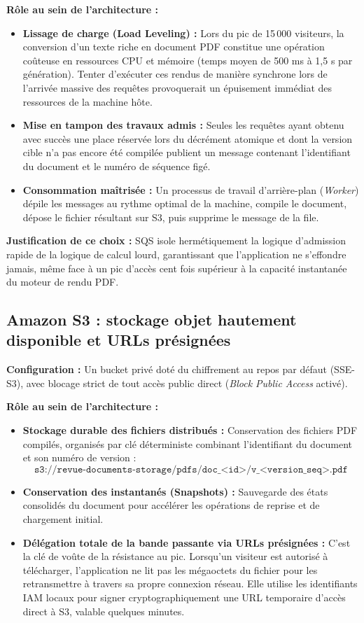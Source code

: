 \textbf{Rôle au sein de l'architecture :}
\begin{itemize}
    \item \textbf{Lissage de charge (Load Leveling) :} Lors du pic de 15\,000 visiteurs, la conversion d'un texte riche en document PDF constitue une opération coûteuse en ressources CPU et mémoire (temps moyen de 500 ms à 1,5 s par génération). Tenter d'exécuter ces rendus de manière synchrone lors de l'arrivée massive des requêtes provoquerait un épuisement immédiat des ressources de la machine hôte.
    \item \textbf{Mise en tampon des travaux admis :} Seules les requêtes ayant obtenu avec succès une place réservée lors du décrément atomique et dont la version cible n'a pas encore été compilée publient un message contenant l'identifiant du document et le numéro de séquence figé.
    \item \textbf{Consommation maîtrisée :} Un processus de travail d'arrière-plan (\emph{Worker}) dépile les messages au rythme optimal de la machine, compile le document, dépose le fichier résultant sur S3, puis supprime le message de la file.
\end{itemize}

\textbf{Justification de ce choix :}
SQS isole hermétiquement la logique d'admission rapide de la logique de calcul lourd, garantissant que l'application ne s'effondre jamais, même face à un pic d'accès cent fois supérieur à la capacité instantanée du moteur de rendu PDF.

\subsection{Amazon S3 : stockage objet hautement disponible et URLs présignées}

\textbf{Configuration :} Un bucket privé doté du chiffrement au repos par défaut (SSE-S3), avec blocage strict de tout accès public direct (\emph{Block Public Access} activé).

\textbf{Rôle au sein de l'architecture :}
\begin{itemize}
    \item \textbf{Stockage durable des fichiers distribués :} Conservation des fichiers PDF compilés, organisés par clé déterministe combinant l'identifiant du document et son numéro de version :
    \begin{equation}
        \texttt{s3://revue-documents-storage/pdfs/doc\_<id>/v\_<version\_seq>.pdf}
    \end{equation}
    \item \textbf{Conservation des instantanés (Snapshots) :} Sauvegarde des états consolidés du document pour accélérer les opérations de reprise et de chargement initial.
    \item \textbf{Délégation totale de la bande passante via URLs présignées :} C'est la clé de voûte de la résistance au pic. Lorsqu'un visiteur est autorisé à télécharger, l'application ne lit pas les mégaoctets du fichier pour les retransmettre à travers sa propre connexion réseau. Elle utilise les identifiants IAM locaux pour signer cryptographiquement une URL temporaire d'accès direct à S3, valable quelques minutes.
\end{itemize}

